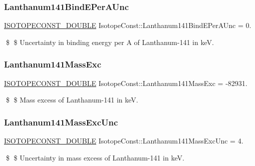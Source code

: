 \subsubsection{\texorpdfstring{Lanthanum141\+Bind\+E\+Per\+A\+Unc}{Lanthanum141BindEPerAUnc}}
{\footnotesize\ttfamily \mbox{\hyperlink{group___isotope_const-_macros_ga8f45a7272ce02c0b4c65c44636ed719a}{I\+S\+O\+T\+O\+P\+E\+C\+O\+N\+S\+T\+\_\+\+D\+O\+U\+B\+LE}} Isotope\+Const\+::\+Lanthanum141\+Bind\+E\+Per\+A\+Unc = 0.}

\$ \$ Uncertainty in binding energy per A of Lanthanum-\/141 in keV. \mbox{\label{group___isotope_const-_lanthanum-_la141_ga4c9fb15909ca1a39456ec6971c411d79}} 
\subsubsection{\texorpdfstring{Lanthanum141\+Mass\+Exc}{Lanthanum141MassExc}}
{\footnotesize\ttfamily \mbox{\hyperlink{group___isotope_const-_macros_ga8f45a7272ce02c0b4c65c44636ed719a}{I\+S\+O\+T\+O\+P\+E\+C\+O\+N\+S\+T\+\_\+\+D\+O\+U\+B\+LE}} Isotope\+Const\+::\+Lanthanum141\+Mass\+Exc = -\/82931.}

\$ \$ Mass excess of Lanthanum-\/141 in keV. \mbox{\label{group___isotope_const-_lanthanum-_la141_ga2130cb0c0bbf58bfd945e206bfc31260}} 
\subsubsection{\texorpdfstring{Lanthanum141\+Mass\+Exc\+Unc}{Lanthanum141MassExcUnc}}
{\footnotesize\ttfamily \mbox{\hyperlink{group___isotope_const-_macros_ga8f45a7272ce02c0b4c65c44636ed719a}{I\+S\+O\+T\+O\+P\+E\+C\+O\+N\+S\+T\+\_\+\+D\+O\+U\+B\+LE}} Isotope\+Const\+::\+Lanthanum141\+Mass\+Exc\+Unc = 4.}

\$ \$ Uncertainty in mass excess of Lanthanum-\/141 in keV. \mbox{\label{group___isotope_const-_lanthanum-_la141_ga8db316c02667895da6ffc07b962f9ae6}} 
